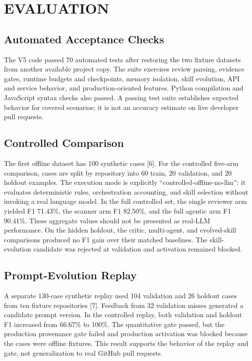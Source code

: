 \documentclass[journal,compsoc]{IEEEtran}
\begin{document}
\section{EVALUATION}
\subsection{Automated Acceptance Checks}
The V5 code passed 70 automated tests after restoring the two fixture datasets from another available project copy. The suite exercises review parsing, evidence gates, runtime budgets and checkpoints, memory isolation, skill evolution, API and service behavior, and production-oriented features. Python compilation and JavaScript syntax checks also passed. A passing test suite establishes expected behavior for covered scenarios; it is not an accuracy estimate on live developer pull requests.

\subsection{Controlled Comparison}
The first offline dataset has 100 synthetic cases [6]. For the controlled five-arm comparison, cases are split by repository into 60 train, 20 validation, and 20 holdout examples. The execution mode is explicitly “controlled-offline-no-llm”: it evaluates deterministic rules, orchestration accounting, and skill selection without invoking a real language model. In the full controlled set, the single reviewer arm yielded F1 71.43\%, the scanner arm F1 82.50\%, and the full agentic arm F1 90.41\%. These aggregate values should not be presented as real-LLM performance. On the hidden holdout, the critic, multi-agent, and evolved-skill comparisons produced no F1 gain over their matched baselines. The skill-evolution candidate was rejected at validation and activation remained blocked.

\subsection{Prompt-Evolution Replay}
A separate 130-case synthetic replay used 104 validation and 26 holdout cases from ten fixture repositories [7]. Feedback from 32 validation misses generated a candidate prompt version. In the controlled replay, both validation and holdout F1 increased from 66.67\% to 100\%. The quantitative gate passed, but the production provenance gate failed and production activation was blocked because the cases were offline fixtures. This result supports the behavior of the replay and gate, not generalization to real GitHub pull requests.
\end{document}
